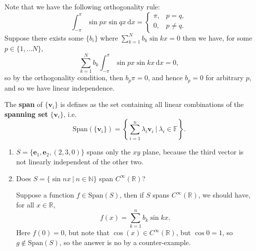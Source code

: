 \documentclass[letter-paper]{tufte-book}
\newenvironment{example}[1][Example]{\begin{trivlist}
\item[\hskip \labelsep {\bfseries #1}]}{\end{trivlist}}
\newcommand{\eb}{{\boldsymbol{e}}}
\newcommand{\vb}{{\boldsymbol{v}}}
\begin{document}
\begin{example}
\begin{enumerate}
    Note that we have the following orthogonality rule:
    \begin{equation*}
      \int_{-\pi}^{\pi} \sin px \sin qx\, \mathrm{d}x = \begin{cases}\pi, & p = q,\\0, & p\neq q.\end{cases}
    \end{equation*}
    Suppose there exists some $\{b_i\}$ where $\sum_{k=1}^N b_k\sin kx = 0$ then we have, for some $p\in \{1, \ldots N\}$,
    \begin{equation*}
      \sum_{k=1}^N b_k \int_{-\pi}^\pi \sin px \sin kx\, \mathrm{d}x = 0,
    \end{equation*}
    so by the orthogonality condition, then $b_p \pi = 0$, and hence $b_p=0$ for arbitrary $p$, and so we have linear independence.
  \end{enumerate}
\end{example}

The \textbf{span} of $\{\vb_i\}$ is defines as the set containing all linear combinations of the \textbf{spanning set} $\{\vb_i\}$, i.e.
\begin{equation}
  \mbox{Span}(\{\vb_i\}) = \left\{ \sum_{i=1}^n \lambda_i \vb_i \ |\ \lambda_i \in \mathbb{F} \right\}.
\end{equation}

\begin{example}
  \begin{enumerate}
    \item $S = \{\eb_1, \eb_2, (2, 3, 0)\}$ spans only the $xy$ plane, because the third vector is not linearly independent of the other two.
    
    \item Does $S=\{\sin nx\ |\ n\in\mathbb{N}\}$ span $C^\infty(\mathbb{R})$?
    
    Suppose a function $f\in \mbox{Span}(S)$, then if $S$ spans $C^\infty(\mathbb{R})$, we should have, for all $x\in \mathbb{R}$,
    \begin{equation*}
      f(x) = \sum_{k=1}^n b_k \sin kx.
    \end{equation*}
    Here $f(0)=0$, but note that $\cos(x)\in C^\infty(\mathbb{R})$, but $\cos 0 =1$, so $g\not\in \mbox{Span}(S)$, so the answer is no by a counter-example.
  \end{enumerate}
\end{example}
\end{document}
